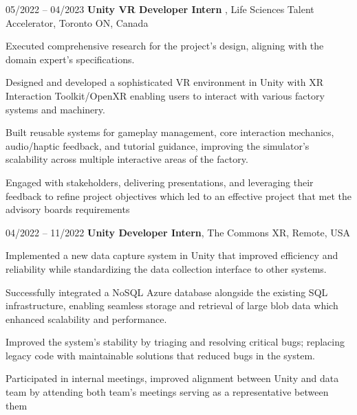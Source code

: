 \vspace{0.2 cm}

   \begin{twocolentry}{
    05/2022 – 04/2023
}
    \textbf{Unity VR Developer Intern }, Life Sciences Talent Accelerator, Toronto ON, Canada\end{twocolentry}

\vspace{0.10 cm}
\begin{onecolentry}
    \begin{highlights}
        \item Executed comprehensive research for the project's design, aligning with the domain expert’s specifications. 
        \item Designed and developed a sophisticated VR environment in Unity with XR Interaction Toolkit/OpenXR enabling users to interact with various factory systems and machinery.
        \item Built reusable systems for gameplay management, core interaction mechanics, audio/haptic feedback, and tutorial guidance, improving the simulator’s scalability across multiple interactive areas of the factory. 
        \item Engaged with stakeholders, delivering presentations, and leveraging their feedback to refine project objectives which led to an effective project that met the advisory boards requirements
    \end{highlights}
\end{onecolentry}
\vspace{0.2 cm}
\begin{twocolentry}{
     04/2022 – 11/2022
}
\textbf{Unity Developer Intern}, The Commons XR, Remote, USA\end{twocolentry}

\vspace{0.10 cm}
\begin{onecolentry}
    \begin{highlights}
        \item Implemented a new data capture system in Unity that improved efficiency and reliability while standardizing the data collection interface to other systems.  
        \item Successfully integrated a NoSQL Azure database alongside the existing SQL infrastructure, enabling seamless storage and retrieval of large blob data which enhanced scalability and performance.  
        \item Improved the system's stability by triaging and resolving critical bugs; replacing legacy code with maintainable solutions that reduced bugs in the system.
        \item Participated in internal meetings, improved alignment between Unity and data team by attending both team's meetings serving as a representative between them
    \end{highlights}
\end{onecolentry}